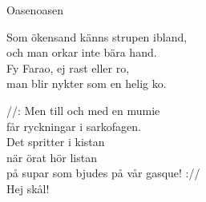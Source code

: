 \begin{song}{Oasen}{oasen}
\begin{vers}
Som ökensand känns strupen ibland,\\
och man orkar inte bära hand.\\
Fy Farao, ej rast eller ro,\\
man blir nykter som en helig ko.\\
\end{vers}
\begin{vers}
//: Men till och med en mumie\\
får ryckningar i sarkofagen.\\
Det spritter i kistan\\
när örat hör listan\\
på supar som bjudes på vår gasque! ://\\
Hej skål!\\
\end{vers}
\end{song}
